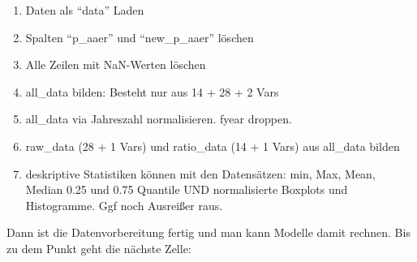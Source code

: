 \documentclass[a4paper, nobind]{templates/ociamthesis}
\providecommand{\tightlist}{%
  \setlength{\itemsep}{0pt}\setlength{\parskip}{0pt}}
\begin{document}
\begin{enumerate}
\def\labelenumi{\arabic{enumi}.}
\tightlist
\item
  Daten als ``data'' Laden
\item
  Spalten ``p\_aaer'' und ``new\_p\_aaer'' löschen
\item
  Alle Zeilen mit NaN-Werten löschen
\item
  all\_data bilden: Besteht nur aus 14 + 28 + 2 Vars
\item
  all\_data via Jahreszahl normalisieren. fyear droppen.
\item
  raw\_data (28 + 1 Vars) und ratio\_data (14 + 1 Vars) aus all\_data bilden
\item
  deskriptive Statistiken können mit den Datensätzen: min, Max, Mean, Median 0.25 und 0.75 Quantile UND normalisierte Boxplots und Histogramme. Ggf noch Ausreißer raus.
\end{enumerate}

Dann ist die Datenvorbereitung fertig und man kann Modelle damit rechnen. Bis zu dem Punkt geht die nächste Zelle:
\end{document}
